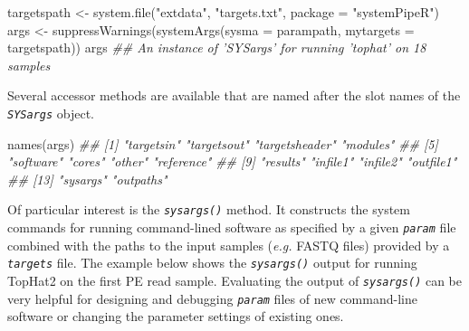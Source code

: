 \documentclass[14pt,]{article}
\newcommand{\hlstr}[1]{\textcolor[rgb]{0.251,0.627,0.251}{#1}}%
\newcommand{\hlcom}[1]{\textcolor[rgb]{0.502,0.502,0.502}{\textit{#1}}}%
\newcommand{\hlstd}[1]{\textcolor[rgb]{0.251,0.251,0.251}{#1}}%
\newcommand{\hlkwc}[1]{\textcolor[rgb]{0.251,0.251,0.251}{#1}}%
\newcommand{\hlkwd}[1]{\textcolor[rgb]{0.878,0.439,0.125}{#1}}%
\newenvironment{Shaded}{\begin{myshaded}}{\end{myshaded}}
\newcommand{\KeywordTok}[1]{\hlkwd{#1}}
\newcommand{\DataTypeTok}[1]{\hlkwc{#1}}
\newcommand{\StringTok}[1]{\hlstr{#1}}
\newcommand{\CommentTok}[1]{\hlcom{#1}}
\newcommand{\NormalTok}[1]{\hlstd{#1}}
\begin{document}
\begin{Shaded}
\begin{Highlighting}[]
\NormalTok{targetspath <-}\StringTok{ }\KeywordTok{system.file}\NormalTok{(}\StringTok{"extdata"}\NormalTok{, }\StringTok{"targets.txt"}\NormalTok{, }\DataTypeTok{package =} \StringTok{"systemPipeR"}\NormalTok{)}
\NormalTok{args <-}\StringTok{ }\KeywordTok{suppressWarnings}\NormalTok{(}\KeywordTok{systemArgs}\NormalTok{(}\DataTypeTok{sysma =}\NormalTok{ parampath, }\DataTypeTok{mytargets =}\NormalTok{ targetspath))}
\NormalTok{args}
\CommentTok{## An instance of 'SYSargs' for running 'tophat' on 18 samples}
\end{Highlighting}
\end{Shaded}

Several accessor methods are available that are named after the slot names of the \emph{\texttt{SYSargs}} object.

\begin{Shaded}
\begin{Highlighting}[]
\KeywordTok{names}\NormalTok{(args)}
\CommentTok{##  [1] "targetsin"     "targetsout"    "targetsheader" "modules"      }
\CommentTok{##  [5] "software"      "cores"         "other"         "reference"    }
\CommentTok{##  [9] "results"       "infile1"       "infile2"       "outfile1"     }
\CommentTok{## [13] "sysargs"       "outpaths"}
\end{Highlighting}
\end{Shaded}

Of particular interest is the \emph{\texttt{sysargs()}} method. It constructs the system
commands for running command-lined software as specified by a given \emph{\texttt{param}}
file combined with the paths to the input samples (\emph{e.g.} FASTQ files) provided
by a \emph{\texttt{targets}} file. The example below shows the \emph{\texttt{sysargs()}} output for
running TopHat2 on the first PE read sample. Evaluating the output of
\emph{\texttt{sysargs()}} can be very helpful for designing and debugging \emph{\texttt{param}} files
of new command-line software or changing the parameter settings of existing
ones.
\end{document}
